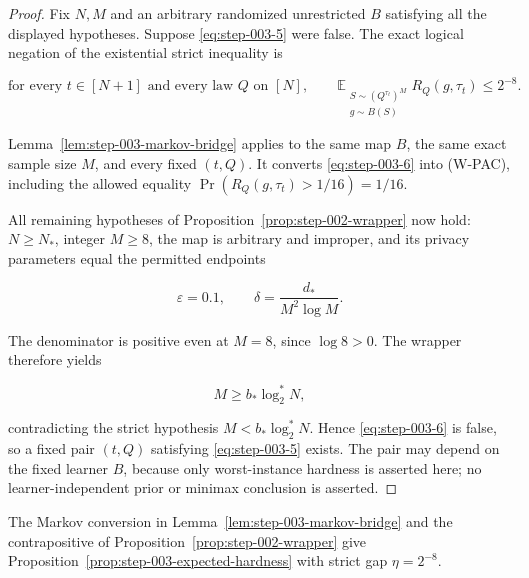 \begin{proof}
Fix \(N,M\) and an arbitrary randomized unrestricted \(B\) satisfying all
the displayed hypotheses. Suppose \eqref{eq:step-003-5} were false. The exact logical
negation of the existential strict inequality is

\[
\text{for every }t\in[N+1]\text{ and every law }Q\text{ on }[N],
\qquad
\mathbb E_{\substack{S\sim(Q^{\tau_t})^M\\g\sim B(S)}}
  R_Q(g,\tau_t)
\le2^{-8}.
\tag{S3.6}\label{eq:step-003-6}
\]

Lemma~\ref{lem:step-003-markov-bridge} applies to the same map \(B\), the
same exact sample size \(M\), and every fixed \((t,Q)\). It converts \eqref{eq:step-003-6} into
(W-PAC), including the allowed equality
\(\Pr(R_Q(g,\tau_t)>1/16)=1/16\).

All remaining hypotheses of Proposition~\ref{prop:step-002-wrapper} now hold:
\(N\ge N_*\), integer \(M\ge8\), the map is arbitrary and improper, and its
privacy parameters equal the permitted endpoints

\[
\varepsilon=0.1,
\qquad
\delta=\frac{d_*}{M^2\log M}.
\]

The denominator is positive even at \(M=8\), since \(\log8>0\). The wrapper therefore yields

\[
M\ge b_*\log_2^*N,
\]

contradicting the strict hypothesis \(M<b_*\log_2^*N\). Hence \eqref{eq:step-003-6} is false,
so a fixed pair \((t,Q)\) satisfying \eqref{eq:step-003-5} exists. The pair may depend on the
fixed learner \(B\), because only worst-instance hardness is asserted here; no
learner-independent prior or minimax conclusion is asserted. \end{proof}
The Markov conversion in Lemma~\ref{lem:step-003-markov-bridge} and the
contrapositive of Proposition~\ref{prop:step-002-wrapper} give
Proposition~\ref{prop:step-003-expected-hardness} with strict gap
$\eta=2^{-8}$.

